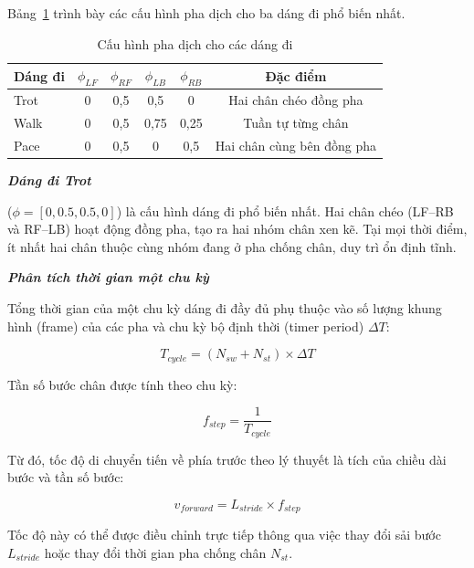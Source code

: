 Bảng~\ref{tab:gait_phases} trình bày các cấu hình pha dịch cho ba dáng đi phổ biến nhất.

\begin{table}[H]
\centering
\caption{Cấu hình pha dịch cho các dáng đi}
\label{tab:gait_phases}
\renewcommand{\arraystretch}{1.3}
\begin{tabular}{|l|c|c|c|c|c|}
\hline
\textbf{Dáng đi} & $\phi_{LF}$ & $\phi_{RF}$ & $\phi_{LB}$ & $\phi_{RB}$ & \textbf{Đặc điểm} \\ \hline
Trot & 0 & 0,5 & 0,5 & 0 & Hai chân chéo đồng pha \\ \hline
Walk & 0 & 0,5 & 0,75 & 0,25 & Tuần tự từng chân \\ \hline
Pace & 0 & 0,5 & 0 & 0,5 & Hai chân cùng bên đồng pha \\ \hline
\end{tabular}
\end{table}

\textbf{\textit{Dáng đi Trot}} 

($\phi = [0, 0.5, 0.5, 0]$) là cấu hình dáng đi phổ biến nhất. Hai chân chéo (LF--RB và RF--LB) hoạt động đồng pha, tạo ra hai nhóm chân xen kẽ. Tại mọi thời điểm, ít nhất hai chân thuộc cùng nhóm đang ở pha chống chân, duy trì ổn định tĩnh.

\textbf{\textit{Phân tích thời gian một chu kỳ}} 

Tổng thời gian của một chu kỳ dáng đi đầy đủ phụ thuộc vào số lượng khung hình (frame) của các pha và chu kỳ bộ định thời (timer period) $\Delta T$:

\begin{equation}
    T_{cycle} = (N_{sw} + N_{st}) \times \Delta T
\end{equation}

Tần số bước chân được tính theo chu kỳ:

\begin{equation}
    f_{step} = \frac{1}{T_{cycle}}
\end{equation}

Từ đó, tốc độ di chuyển tiến về phía trước theo lý thuyết là tích của chiều dài bước và tần số bước:

\begin{equation}
    v_{forward} = L_{stride} \times f_{step}
\end{equation}

Tốc độ này có thể được điều chỉnh trực tiếp thông qua việc thay đổi sải bước $L_{stride}$ hoặc thay đổi thời gian pha chống chân $N_{st}$.



